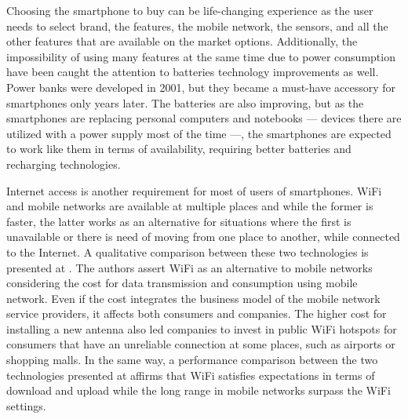 Choosing the smartphone to buy can be life-changing experience
as the user needs to select brand, the features, the mobile network, the sensors, and all the other features that are available on the market options.
Additionally, the impossibility of using many features at the same time due to power consumption have been caught the attention to  batteries technology improvements as well.
Power banks were developed in 2001, but they became a must-have accessory for smartphones only years later.
The batteries are also improving, but as the smartphones are replacing personal
computers and notebooks --- devices there are utilized with a power supply most of the time ---, the smartphones are expected to work like them in terms of availability, requiring better batteries and recharging technologies.

Internet access is another requirement for most of users of smartphones.
WiFi and mobile networks
are available at multiple places and while the former is faster, the latter works as an alternative for situations where the first is unavailable or there is need of moving from one place to another, while connected to the Internet.
A qualitative comparison between these two technologies is presented at \cite{Lehr2003wireless}.
The authors assert WiFi as an alternative to mobile networks considering the cost for data transmission and consumption using mobile network.
Even if the cost integrates the business model of the mobile network service providers, it affects both consumers and companies.
The higher cost for installing a new antenna also led companies to invest in public WiFi hotspots for consumers that have an unreliable connection at some places, such as airports or shopping malls.
In the same way, a performance comparison between the two technologies presented at \cite{Gass20103gwificomparison} affirms that WiFi satisfies expectations in terms of download and upload while the long range in mobile networks surpass the WiFi settings.


